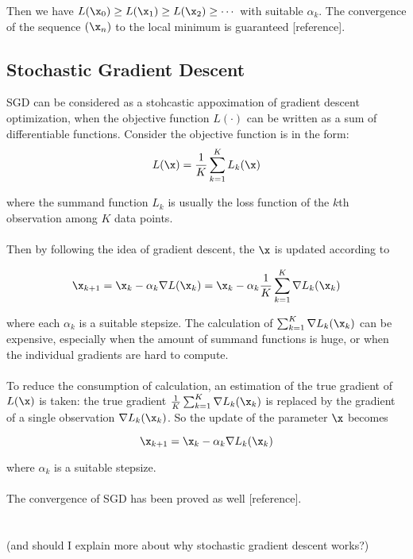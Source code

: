         
        Then we have $ L(\x_0) \geq L(\x_1) \geq L(\x_2) \geq \cdots$ with suitable $\alpha_k$. The convergence of the 
        sequence $(\x_n)$ to the local minimum is guaranteed{\color{red} [reference]}.


    \subsection{Stochastic Gradient Descent}
        SGD can be considered as a stohcastic appoximation of gradient descent optimization, 
        when the objective function $L(\cdot)$ can be written as a sum of differentiable functions.
        Consider the objective function is in the form:
        \begin{equation}
            L(\x) =\frac{1}{K} \sum_{k=1}^{K} L_k (\x)
        \end{equation}

        where the summand function $L_k$ is usually the loss function of the $k$th observation among
        $K$ data points.
        \\\\
        Then by following the idea of gradient descent, the $\x$ is updated according to
        
        \begin{equation}
           \x_{k+1} = \x_{k} -\alpha_k \nabla L(\x_k) = \x_{k} -\alpha_k \frac{1}{K}\sum_{k=1}^{K} \nabla L_k(\x_k) 
        \end{equation}
        
        
        where each $\alpha_k$ is a suitable stepsize. The calculation of $\sum_{k=1}^{K} \nabla L_k(\x_k)$ can be
        expensive, especially when the amount of summand functions is huge, or when the individual gradients are hard to
        compute. 
        \\\\
        To reduce the consumption of calculation, an estimation of the true gradient of $L(\x)$ is taken: 
        the true gradient $\frac{1}{K} \sum_{k=1}^{K} \nabla L_k(\x_k)$ is replaced by the gradient of a single observation $\nabla L_k(\x_k)$. 
        So the update of the parameter $\x$ becomes
        
        \begin{equation}
            \x_{k+1} = \x_{k} - \alpha_k \nabla L_k(\x_k)
        \end{equation}
        
        where $\alpha_k$ is a suitable stepsize. 
        \\\\
        The convergence of SGD has been proved as well{\color{red} [reference]}. 
        \\\\\\
        (and should I explain more about why stochastic gradient descent works?)
